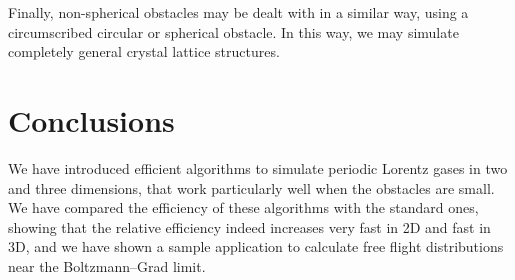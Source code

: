 \documentclass[pre,amsmath,amssymb, twocolumn, showpacs]{revtex4-1}
\renewcommand{\vec}[1]{\mathbf{#1}}
\begin{document}
%

Finally, non-spherical obstacles may be dealt with in a similar way, using a circumscribed circular or spherical obstacle. In this way, we may simulate completely general crystal lattice structures.

\section{Conclusions}  

We have introduced efficient algorithms to simulate periodic Lorentz gases in two and three dimensions, that work particularly well when the obstacles are small. We have compared the efficiency of these algorithms with the standard ones, showing that the relative efficiency indeed increases very fast in 2D and fast in 3D, and we have shown a sample application to calculate free flight distributions near the Boltzmann--Grad limit.
\end{document}
